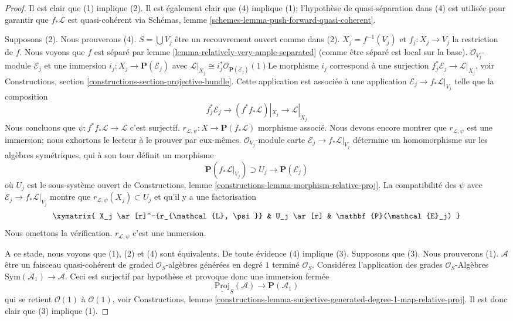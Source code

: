\begin{proof}
Il est clair que (1) implique (2). Il est également clair que (4) implique (1); l'hypothèse de quasi-séparation dans (4) est utilisée pour garantir que $f_*\mathcal{L}$ est quasi-cohérent via Schémas, lemme \ref{schemes-lemma-push-forward-quasi-coherent}.

\medskip\noindent

Supposons (2). Nous prouverons (4). $S = \bigcup V_j$ être un recouvrement ouvert comme dans (2). $X_j = f^{-1}(V_j)$ et $f_j : X_j \to V_j$ la restriction de $f$. Nous voyons que $f$ est séparé par lemme \ref{lemma-relatively-very-ample-separated} (comme être séparé est local sur la base). $\mathcal{O}_{V_j}$-module $\mathcal{E}_j$ et une immersion
$i_j : X_j \to \mathbf{P}(\mathcal{E}_j)$ avec
$\mathcal{L}|_{X_j} \cong i_j^*\mathcal{O}_{\mathbf{P}(\mathcal{E}_j)}(1)$Le morphisme $i_j$ correspond à une surjection
$f_j^*\mathcal{E}_j \to \mathcal{L}|_{X_j}$, voir Constructions, section \ref{constructions-section-projective-bundle}. Cette application est associée à une application $\mathcal{E}_j \to f_*\mathcal{L}|_{V_j}$
telle que la composition
$$
f_j^*\mathcal{E}_j \to (f^*f_*\mathcal{L})|_{X_j} \to \mathcal{L}|_{X_j}
$$
Nous concluons que
$\psi : f^*f_*\mathcal{L} \to \mathcal{L}$ c'est surjectif.
$r_{\mathcal{L}, \psi} : X \to \mathbf{P}(f_*\mathcal{L})$ morphisme associé. Nous devons encore montrer que $r_{\mathcal{L}, \psi}$
est une immersion; nous exhortons le lecteur à le prouver par eux-mêmes. $\mathcal{O}_{V_j}$-module carte $\mathcal{E}_j \to f_*\mathcal{L}|_{V_j}$
détermine un homomorphisme sur les algèbres symétriques, qui à son tour définit un morphisme
$$
\mathbf{P}(f_*\mathcal{L}|_{V_j}) \supset U_j \longrightarrow
\mathbf{P}(\mathcal{E}_j)
$$
où $U_j$ est le sous-système ouvert de Constructions, lemme \ref{constructions-lemma-morphism-relative-proj}. La compatibilité des $\psi$ avec $\mathcal{E}_j \to f_*\mathcal{L}|_{V_j}$
montre que $r_{\mathcal{L}, \psi}(X_j) \subset U_j$ et qu'il y a une factorisation
$$
\xymatrix{
X_j \ar[r]^-{r_{\mathcal{L}, \psi}} & U_j \ar[r] &
\mathbf{P}(\mathcal{E}_j)
}
$$
Nous omettons la vérification. $r_{\mathcal{L}, \psi}$ c'est une immersion.

\medskip\noindent

A ce stade, nous voyons que (1), (2) et (4) sont équivalents. De toute évidence (4) implique (3). Supposons que (3). Nous prouverons (1). $\mathcal{A}$ être un faisceau quasi-cohérent de graded $\mathcal{O}_S$-algèbres générées en degré $1$ terminé $\mathcal{O}_S$. Considérez l'application des grades $\mathcal{O}_S$-Algèbres $\text{Sym}(\mathcal{A}_1) \to \mathcal{A}$. Ceci est surjectif par hypothèse et provoque donc une immersion fermée
$$
\underline{\text{Proj}}_S(\mathcal{A})
\longrightarrow
\mathbf{P}(\mathcal{A}_1)
$$
qui se retient $\mathcal{O}(1)$ à $\mathcal{O}(1)$, voir Constructions, lemme
\ref{constructions-lemma-surjective-generated-degree-1-map-relative-proj}. Il est donc clair que (3) implique (1).

\end{proof}

